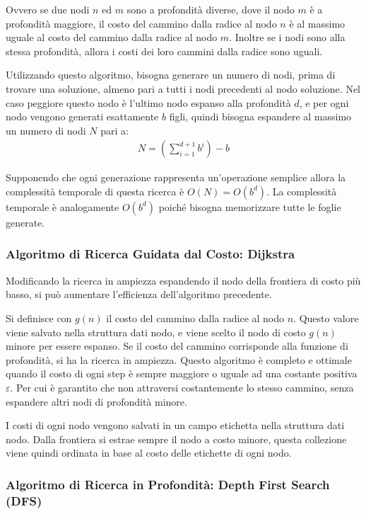 \documentclass{article}
\numberwithin{equation}{subsection}
\begin{document}
Ovvero se due nodi $n$ ed $m$ sono a profondità diverse, dove il nodo $m$ è a profondità maggiore, 
il costo del cammino dalla radice al nodo $n$ è al massimo uguale al costo del cammino dalla radice 
al nodo $m$. Inoltre se i nodi sono alla stessa profondità, allora i costi dei loro cammini dalla radice 
sono uguali. 


Utilizzando questo algoritmo, bisogna generare un numero di nodi, prima di trovare una soluzione,  
almeno pari a tutti i nodi precedenti al nodo soluzione. Nel caso peggiore questo nodo è 
l'ultimo nodo espanso alla profondità $d$, e per ogni nodo vengono generati esattamente $b$ 
figli, quindi bisogna espandere al massimo un numero di nodi $N$ pari a:
\begin{gather*}
    N=\left(\displaystyle\sum_{i=1}^{d+1}b^i\right)-b
\end{gather*}

Supponendo che ogni generazione rappresenta un'operazione semplice allora la complessità 
temporale di questa ricerca è $O(N)=O(b^d)$. La complessità temporale è analogamente 
$O(b^d)$ poiché bisogna memorizzare tutte le foglie generate. 

\subsubsection{Algoritmo di Ricerca Guidata dal Costo: Dijkstra}
\label{sec:Dijkstra}
Modificando la ricerca in ampiezza espandendo il nodo della frontiera di costo più basso, si può 
aumentare l'efficienza dell'algoritmo precedente. 

Si definisce con $g(n)$ il costo del cammino dalla radice al nodo $n$. Questo valore viene 
salvato nella struttura dati nodo, e viene scelto il nodo di costo $g(n)$ minore per essere 
espanso. Se il costo del cammino corrisponde alla funzione di profondità, si ha la ricerca 
in ampiezza. 
Questo algoritmo è completo e ottimale quando il costo di ogni step è sempre 
maggiore o uguale ad una costante positiva $\varepsilon$. Per cui è garantito che non attraversi 
costantemente lo stesso cammino, senza espandere altri nodi di profondità minore. 

I costi di ogni nodo vengono salvati in un campo etichetta nella struttura dati nodo. 
Dalla frontiera si estrae sempre il nodo a costo minore, questa collezione viene quindi 
ordinata in base al costo delle etichette di ogni nodo. 

\subsubsection{Algoritmo di Ricerca in Profondità: Depth First Search (DFS)}
\end{document}
